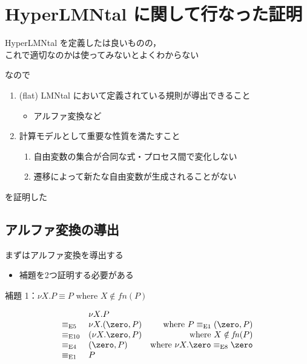 \section[Proofs]{HyperLMNtal に関して行なった証明}

\begin{frame}{}
  HyperLMNtal を定義したは良いものの，\\
  これで適切なのかは使ってみないとよくわからない

  なので
  \begin{enumerate}
  \item
    (flat) LMNtal において定義されている規則が導出できること
    \begin{itemize}
    \item アルファ変換など
    \end{itemize}
  \item
    計算モデルとして重要な性質を満たすこと
    \begin{enumerate}
    \item 自由変数の集合が合同な式・プロセス間で変化しない
    \item 遷移によって新たな自由変数が生成されることがない
    \end{enumerate}
  \end{enumerate}
  を証明した
\end{frame}

\subsection{アルファ変換の導出}

\begin{frame}{}
  まずはアルファ変換を導出する
  \begin{itemize}
  \item 補題を2つ証明する必要がある
  \end{itemize}
\end{frame}

\begin{frame}{補題 1：$\nu X.P \equiv P \mbox{ where } X \notin \mathit{fn}(P)$}

  \[\begin{array}{llr}
  & \nu X.P &
  \\
  \equiv_{\mbox{\scriptsize E5}}
  & \nu X.(\zero, P)
  & \mbox{where } P \equiv_{\scriptsize \mbox{E1}} (\zero, P)
  \\
  \equiv_{\mbox{\scriptsize E10}}
  & (\nu X.\zero, P)
  & \mbox{where } X \notin \mathit{fn}(P)
  \\
  \equiv_{\mbox{\scriptsize E4}}
  & (\zero, P)
  & \mbox{where } \nu X.\zero \equiv_{\mbox{\scriptsize E8}} \zero
  \\
  \equiv_{\mbox{\scriptsize E1}} & P
  \end{array}\]    

\end{frame}


